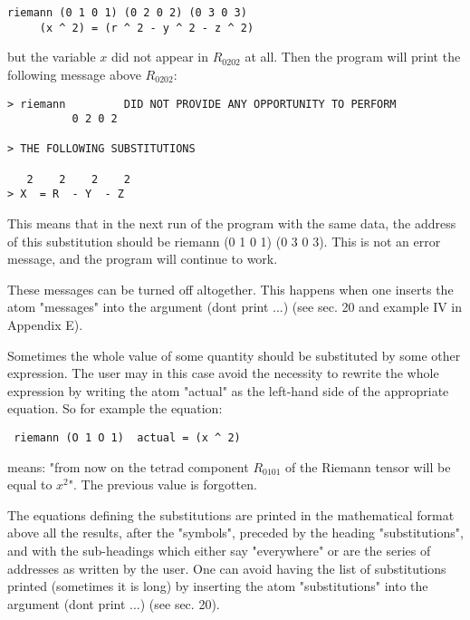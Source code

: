 \bigskip

\begin{verbatim}
riemann (0 1 0 1) (0 2 0 2) (0 3 0 3)
     (x ^ 2) = (r ^ 2 - y ^ 2 - z ^ 2)
\end{verbatim}

\bigskip

\noindent but the variable $x$ did not appear in $R_{0 2 0 2}$ at all. Then the
program will print the following message above $R_{0 2 0 2}$:

\bigskip

\begin{verbatim}
> riemann         DID NOT PROVIDE ANY OPPORTUNITY TO PERFORM
          0 2 0 2

> THE FOLLOWING SUBSTITUTIONS

   2    2    2    2
> X  = R  - Y  - Z
\end{verbatim}

\bigskip

\noindent This means that in the next run of the program with the same data,
the address of this substitution should be riemann (0 1 0 1) (0 3 0 3). This is
not an error message, and the program will continue to work.

These messages can be turned off altogether. This  happens  when  one  inserts
the atom "messages" into the argument (dont print ...) (see sec. 20 and example
IV in Appendix E).

Sometimes the whole value of some  quantity  should  be
     substituted  by  some other expression. The user may in this
     case avoid the necessity to rewrite the whole expression  by
writing  the atom "actual" as the left-hand side of the appropriate equation.
So for example the equation:

\bigskip

\begin{verbatim}
 riemann (O 1 O 1)  actual = (x ^ 2)
\end{verbatim}

\bigskip

\noindent means: "from now  on  the  tetrad  component $R_{0 1 0 1}$ of the
Riemann tensor will be equal to $x^2$". The previous value  is forgotten.

The equations defining the substitutions are printed in the  mathematical
format  above  all the results, after the "symbols", preceded by the heading
"substitutions", and with the
     sub-headings  which  either say "everywhere" or are the series
     of addresses as written by the user. One  can  avoid  having
     the  list of substitutions printed (sometimes it is long) by
inserting the atom "substitutions" into  the  argument  (dont print ...) (see
sec. 20).

